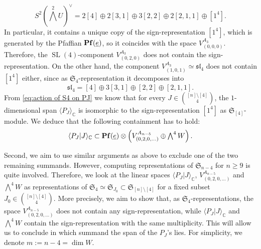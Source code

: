 \documentclass[11pt,reqno]{amsart}
\theoremstyle{definition}
\numberwithin{theorem}{section}
\DeclareMathOperator{\Pf}{\bf Pf}
\DeclareMathOperator{\SL}{SL}
\numberwithin{equation}{section}
\begin{document}
\[ \textstyle{S^2(\bigwedge^2U)^\vee} = 2  [4] \oplus 2 [3,1] \oplus 3  [2,2] \oplus 2 [2,1,1] \oplus [1^4] .\]
\noindent In particular, it contains a unique copy of the sign-representation $[1^4]$, which is generated by the Pfaffian $\Pf(\underline{e})$, so it coincides with the space $V_{(0,0,0)}^{A_3}$. Therefore, the $\SL(4)$-component $V_{(0,2,0)}^{A_3}$ does not contain the sign-representation. On the other hand, the component $V_{(1,0,1)}^{A_3}\simeq \mathfrak{sl}_4$ does not contain $[1^4]$ either, since as $\mathfrak{S}_4$-representation it decomposes into
\[ \mathfrak{sl}_4 = [4] \oplus 3[3,1] \oplus [2,2] \oplus [2,1,1] .\]
\noindent From \eqref{eq:action of S4 on PJ} we know that for every $J\in \binom{[n]\setminus[4]}{4}$, the $1$-dimensional span $\langle P_J \rangle_\mathbb C$ is isomorphic to the sign-representation $[1^4]$ as $\mathfrak{S}_{[4]}$-module. We deduce that the following containment has to hold:
\begin{equation}\label{eq:PJ in first two summands}
\langle P_J|J\rangle_{\mathbb C}\subset \Pf(\underline{e})\otimes \left( V_{(0,2,0,\ldots)}^{A_{n-5}}  \oplus  \textstyle{\bigwedge^4W}\right) .
\end{equation}

\indent Second, we aim to use similar arguments as above to exclude one of the two remaining summands. However, computing representations of $\mathfrak{S}_{n-4}$ for $n\geq 9$ is quite involved. Therefore, we look at the linear spaces $\langle P_J|J\rangle_\mathbb C$, $V_{(0,2,0,\ldots)}^{A_{n-5}}$ and $\bigwedge^4W$ as representations of $\mathfrak{S}_4 \simeq \mathfrak{S}_{J_0} \subset \mathfrak{S}_{[n]\setminus [4]}$ for a fixed subset $J_0\in \binom{[n]\setminus [4]}{4}$. More precisely, we aim to show that, as $\mathfrak{S}_4$-representations, the space $V_{(0,2,0,\ldots)}^{A_{n-5}}$ does not contain any sign-representation, while $\langle P_J|J\rangle_{\mathbb C}$ and $\bigwedge^4W$ contain the sign-representation with the same multiplicity. This will allow us to conclude in which summand the span of the $P_J$'s lies. For simplicity, we denote $m:= n-4 = \dim W$.
\end{document}
